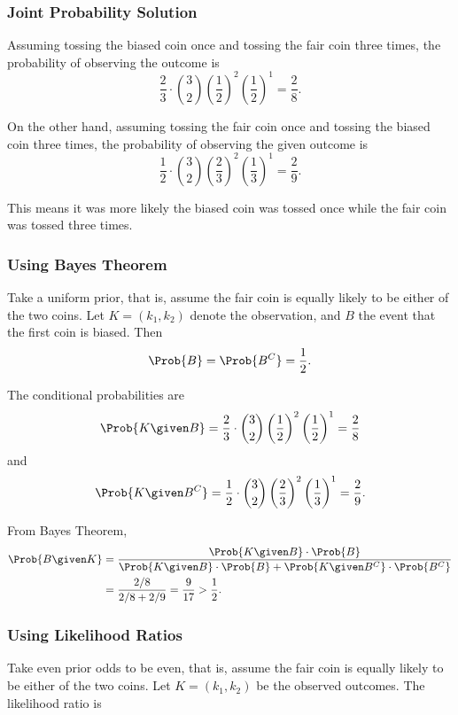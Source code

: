 \documentclass[12pt]{article}
\begin{document}
\subsubsection*{Joint Probability Solution}

Assuming tossing the biased coin once and tossing the fair coin three
times, the probability of observing the outcome is
\[
    \frac{2}{3} \cdot \binom{3}{2} \left( \frac{1}{2} \right)^2 \left(
    \frac{1}{2} \right)^1 = \frac{2}{8}.
\]

On the other hand, assuming tossing the fair coin once and tossing the
biased coin three times, the probability of observing the given outcome
is
\[
    \frac{1}{2} \cdot \binom{3}{2} \left( \frac{2}{3} \right)^2 \left(
    \frac{1}{3} \right)^1 = \frac{2}{9}.
\]

This means it was more likely the biased coin was tossed once while the
fair coin was tossed three times.

\subsubsection*{Using Bayes Theorem}

Take a uniform prior, that is, assume the fair coin is equally likely to
be either of the two coins.  Let \( K = (k_1, k_2) \) denote the
observation, and \( B \) the event that the first coin is biased. Then
\[
    \Prob{B} = \Prob{B^C} = \frac{1}{2}.
\]

The conditional probabilities are
\[
    \Prob{K \given B} = \frac{2}{3} \cdot \binom{3}{2} \left( \frac{1}{2}
    \right)^2 \left( \frac{1}{2} \right)^1 = \frac{2}{8}
\] and
\[
    \Prob{K \given B^C} = \frac{1}{2} \cdot \binom{3}{2} \left( \frac{2}
    {3} \right)^2 \left( \frac{1}{3} \right)^1 = \frac{2}{9}.
\]

From Bayes Theorem,~%
\begin{align*}
    \Prob{B \given K} &= \frac{\Prob{K \given B} \cdot \Prob{B}}{\Prob{K
    \given B} \cdot \Prob{B} + \Prob{K \given B^C} \cdot \Prob{B^C}} \\
    &= \frac{2/8}{2/8 + 2/9} = \frac{9}{17} > \frac{1}{2}.
\end{align*}

\subsubsection*{Using Likelihood Ratios}

Take even prior odds to be even, that is, assume the fair coin is
equally likely to be either of the two coins.  Let \( K = (k_1, k_2) \)
be the observed outcomes.  The likelihood ratio is~%
\end{document}
